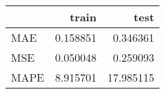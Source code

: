 \begin{tabular}{lrr}
\toprule
{} &     train &       test \\
\midrule
MAE  &  0.158851 &   0.346361 \\
MSE  &  0.050048 &   0.259093 \\
MAPE &  8.915701 &  17.985115 \\
\bottomrule
\end{tabular}
